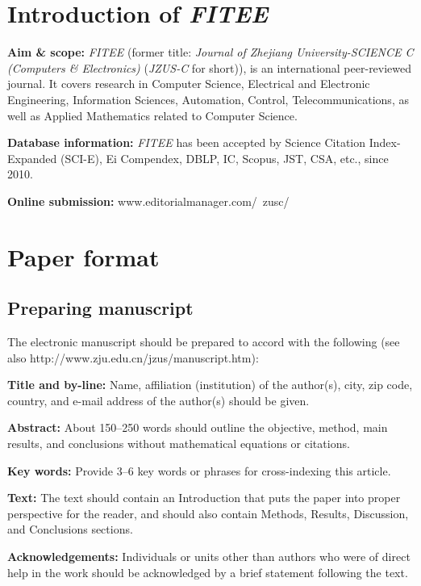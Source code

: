 \documentclass[twoside,twocolumn]{article}
\begin{document}
\section{Introduction of \emph{FITEE}}

\noindent \textbf{Aim \& scope:} \emph{FITEE} (former title: \emph{Journal of Zhejiang University-SCIENCE C (Computers {\sf \slshape \&} Electronics)} (\emph{JZUS-C} for short)), is an international peer-reviewed journal. It covers research in Computer Science, Electrical and Electronic Engineering, Information Sciences, Automation, Control, Telecommunications, as well as Applied Mathematics related to Computer Science.

\noindent \textbf{Database information:} \emph{FITEE} has been accepted by Science Citation Index-Expanded (SCI-E), Ei Compendex, DBLP, IC, Scopus, JST, CSA, etc., since 2010.


\noindent \textbf{Online submission:} www.editorialmanager.com/\ zusc/

\section{Paper format}

\subsection{Preparing manuscript}

The electronic manuscript should be prepared to accord with the following (see also http://www.zju.edu.cn/jzus/manuscript.htm):

\noindent \textbf{Title and by-line:} Name, affiliation (institution) of the author(s), city, zip code, country, and e-mail address of the author(s) should be given.

\noindent \textbf{Abstract:} About 150--250 words should outline the objective, method, main results, and conclusions without mathematical equations or citations.

\noindent \textbf{Key words:} Provide 3--6 key words or phrases for cross-indexing this article.

\noindent \textbf{Text:} The text should contain an Introduction that puts the paper into proper perspective for the reader, and should also contain Methods, Results, Discussion, and Conclusions sections.

\noindent \textbf{Acknowledgements:} Individuals or units other than authors who were of direct help in the work should be acknowledged by a brief statement following the text.
\end{document}
